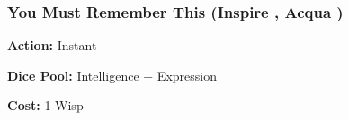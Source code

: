 \subsubsection*{You Must Remember This (Inspire \textbullet\textbullet, Acqua \textbullet)}

\noindent \textbf{Action:} Instant 

\noindent \textbf{Dice Pool:} Intelligence + Expression 

\noindent \textbf{Cost:} 1 Wisp

